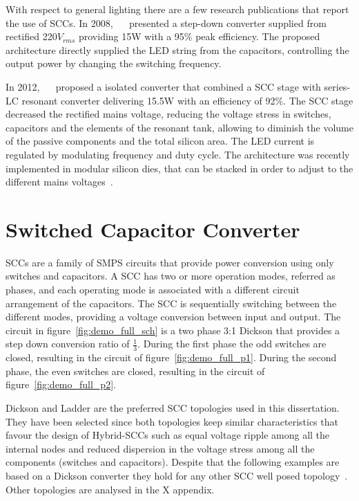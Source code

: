 With respect to general lighting there are a few research publications that report the use of SCCs. In 2008, ~\citeauthor{08Lee}~\cite{08Lee} presented a step-down converter supplied from rectified 220$V_{rms}$ providing 15W with a 95\% peak efficiency. The proposed architecture directly supplied the LED string from the capacitors, controlling the output power by changing the switching frequency.

In 2012, ~\citeauthor{2012Kline}~\cite{2012Kline} proposed a isolated converter that combined a SCC stage with series-LC resonant converter delivering 15.5W with an efficiency of  92\%.  The SCC stage decreased  the rectified mains voltage, reducing the voltage stress in switches, capacitors and the elements of the resonant tank, allowing to diminish  the volume of the passive components and the total silicon area. The LED current is regulated by modulating frequency and duty cycle.  The architecture was recently implemented in modular silicon dies, that can be stacked in order to adjust to the different mains voltages~\cite{2013Kline}.



\section{Switched Capacitor Converter}

SCCs are a family of SMPS circuits that provide power conversion using only switches and capacitors. %
A SCC has two or more operation modes, referred as phases, and each operating mode is associated with a different circuit arrangement of the capacitors. The SCC is sequentially switching between the different modes, providing a voltage conversion between input and output. The circuit in figure~\ref{fig:demo_full_sch} is a two phase 3:1 Dickson that provides a step down conversion ratio of $\frac{1}{3}$. During the first phase the odd switches are closed, resulting in the circuit of figure~\ref{fig:demo_full_p1}. During the second phase, the even switches are closed, resulting in the circuit of figure~\ref{fig:demo_full_p2}.

Dickson and Ladder are the preferred SCC topologies used in this dissertation. They have been selected since both topologies keep similar characteristics that favour the design of Hybrid-SCCs such as equal voltage ripple among all the internal nodes and reduced dispersion in the voltage stress among all the components (switches and capacitors). Despite that the following examples are based on a Dickson converter they hold for any other SCC well posed topology~\cite{Seeman:EECS-2009-78}. Other topologies are analysed in the X appendix.

